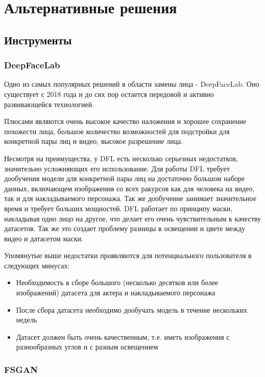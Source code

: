 \section{Альтернативные решения}

\subsection{Инструменты}

\subsubsection{DeepFaceLab}

Одно из самых популярных решений в области замены лица - DeepFaceLab\cite{deepfacelab}. Оно существует с 2018 года и до сих пор остается передовой и активно развивающейся технологией.

Плюсами являются очень высокое качество наложения и хорошее сохранение похожести лица, большое количество возможностей для подстройки для конкретной пары лиц и видео, высокое разрешение лица.

Несмотря на преимущества, у DFL есть несколько серьезных недостатков, значительно усложняющих его использование. Для работы DFL требует дообучения модели для конкретной пары лиц на достаточно большом наборе данных, включающем изображения со всех ракурсов как для человека на видео, так и для накладываемого персонажа.
Так же дообучение занимает значительное время и требует больших мощностей.
DFL работает по принципу маски, накладывая одно лицо на другое, что делает его очень чувствительным к качеству датасетов. Так же это создает проблему разницы в освещении и цвете между видео и датасетом маски.

Упомянутые выше недостатки проявляются для потенциального пользователя в следующих минусах:

\begin{itemize}
    \item Необходимость в сборе большого (несколько десятков или более изображений) датасета для актера и накладываемого персонажа
    \item После сбора датасета необходимо дообучать модель в течение нескольких недель
    \item Датасет должен быть очень качественным, т.е. иметь изображения с разнообразных углов и с разным освещением
\end{itemize}

\subsubsection{FSGAN}

